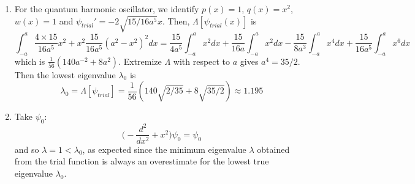 \documentclass[a4paper]{article}
\begin{document}
\begin{ans}
\begin{enumerate}[label=(\roman*)]
\begin{enumerate}[label=(\alph*)]
\item For the quantum harmonic oscillator, we identify $p(x)=1$, $q(x)=x^2$, $w(x)=1$ and $\psi_{trial}'=-2\sqrt{15/16a^5}x$. Then, $\Lambda[\psi_{trial}(x)]$ is
$$\int_{-a}^a\frac{4\times 15}{16a^5}x^2+x^2\frac{15}{16a^5}(a^2-x^2)^2dx=\frac{15}{4a^5}\int_{-a}^ax^2dx+\frac{15}{16a}\int_{-a}^ax^2dx-\frac{15}{8a^3}\int_{-a}^ax^4dx+\frac{15}{16a^5}\int_{-a}^ax^6dx$$
which is $\frac{1}{56}(140 a^{-2}+8a^2)$. Extremize $\Lambda$ with respect to $a$ gives $a^4=35/2$. Then the lowest eigenvalue $\lambda_0$ is
$$\lambda_0=\Lambda[\psi_{trial}]=\frac{1}{56}(140\sqrt{2/35}+8\sqrt{35/2})\approx 1.195$$
\item Take $\psi_0$:
$$\bigg(-\frac{d^2}{dx^2}+x^2\bigg)\psi_0=\psi_0$$
and so $\lambda=1<\lambda_0$, as expected since the minimum eigenvalue $\lambda$ obtained from the trial function is always an overestimate for the lowest true eigenvalue $\lambda_0$.
\end{enumerate}
\end{enumerate}
\end{ans}
\newpage
\end{document}

